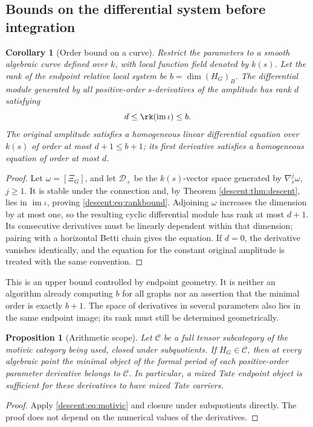 \documentclass[11pt,a4paper,oneside]{article}
\theoremstyle{plain}
\newtheorem{proposition}[theorem]{Proposition}
\newtheorem{corollary}[theorem]{Corollary}
\theoremstyle{definition}
\theoremstyle{remark}
\newcommand{\im}{\operatorname{im}}
\numberwithin{equation}{section}
\begin{document}
\subsection{Bounds on the differential system before integration}
\begin{corollary}[Order bound on a curve]\label{descent:cor:ode}
Restrict the parameters to a smooth algebraic curve defined over $k$, with local function field denoted by $k(s)$.
Let the rank of the endpoint relative local system be $b=\dim(H_G)_B$.
The differential module generated by all positive-order $s$-derivatives of the amplitude has rank $d$ satisfying
\begin{equation}\label{descent:eq:rankbound}
 d\leq\rk(\im\iota)\leq b.
\end{equation}
The original amplitude satisfies a homogeneous linear differential equation over $k(s)$ of order at most $d+1\leq b+1$; its first derivative satisfies a homogeneous equation of order at most $d$.
\end{corollary}
\begin{proof}
Let $\omega=[\Xi_G]$, and let $\mathcal D_+$ be the $k(s)$-vector space generated by $\nabla_s^j\omega$, $j\geq1$.
It is stable under the connection and, by Theorem \ref{descent:thm:descent}, lies in $\im\iota$, proving \eqref{descent:eq:rankbound}.
Adjoining $\omega$ increases the dimension by at most one, so the resulting cyclic differential module has rank at most $d+1$.
Its consecutive derivatives must be linearly dependent within that dimension; pairing with a horizontal Betti chain gives the equation.
If $d=0$, the derivative vanishes identically, and the equation for the constant original amplitude is treated with the same convention.
\end{proof}

This is an upper bound controlled by endpoint geometry. It is neither an algorithm already computing $b$ for all graphs nor an assertion that the minimal order is exactly $b+1$.
The space of derivatives in several parameters also lies in the same endpoint image; its rank must still be determined geometrically.

\begin{proposition}[Arithmetic scope]\label{descent:prop:arithmetic}
Let $\mathcal C$ be a full tensor subcategory of the motivic category being used, closed under subquotients.
If $H_G\in\mathcal C$, then at every algebraic point the minimal object of the formal period of each positive-order parameter derivative belongs to $\mathcal C$.
In particular, a mixed Tate endpoint object is sufficient for these derivatives to have mixed Tate carriers.
\end{proposition}
\begin{proof}
Apply \eqref{descent:eq:motivic} and closure under subquotients directly. The proof does not depend on the numerical values of the derivatives.
\end{proof}
\end{document}
